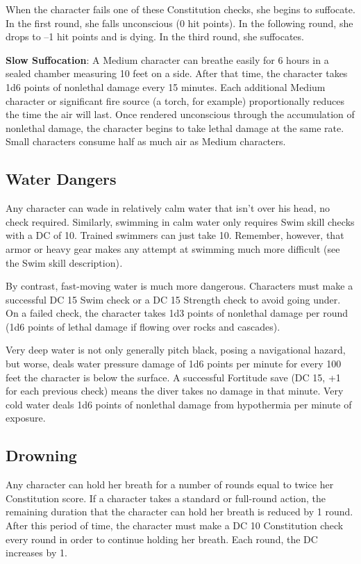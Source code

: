 When the character fails one of these Constitution checks, she begins to suffocate. In the first round, she falls unconscious (0 hit points). In the following round, she drops to --1 hit points and is dying. In the third round, she suffocates.
				
\textbf{Slow Suffocation}: A Medium character can breathe easily for 6 hours in a sealed chamber measuring 10 feet on a side. After that time, the character takes 1d6 points of nonlethal damage every 15 minutes. Each additional Medium character or significant fire source (a torch, for example) proportionally reduces the time the air will last. Once rendered unconscious through the accumulation of nonlethal damage, the character begins to take lethal damage at the same rate. Small characters consume half as much air as Medium characters.
				
\subsection{Water Dangers}

				
Any character can wade in relatively calm water that isn't over his head, no check required. Similarly, swimming in calm water only requires Swim skill checks with a DC of 10. Trained swimmers can just take 10. Remember, however, that armor or heavy gear makes any attempt at swimming much more difficult (see the Swim skill description)\textit{.}
				
By contrast, fast-moving water is much more dangerous. Characters must make a successful DC 15 Swim check or a DC 15 Strength check to avoid going under. On a failed check, the character takes 1d3 points of nonlethal damage per round (1d6 points of lethal damage if flowing over rocks and cascades).
				
Very deep water is not only generally pitch black, posing a navigational hazard, but worse, deals water pressure damage of 1d6 points per minute for every 100 feet the character is below the surface. A successful Fortitude save (DC 15, +1 for each previous check) means the diver takes no damage in that minute. Very cold water deals 1d6 points of nonlethal damage from hypothermia per minute of exposure.
				
\subsection{Drowning}

				
Any character can hold her breath for a number of rounds equal to twice her Constitution score. If a character takes a standard or full-round action, the remaining duration that the character can hold her breath is reduced by 1 round. After this period of time, the character must make a DC 10 Constitution check every round in order to continue holding her breath. Each round, the DC increases by 1. 
				
